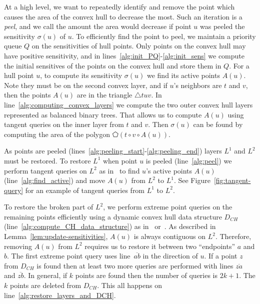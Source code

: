 \documentclass{cccg24}
\newcommand{\lrParents}[1]{\left( #1 \right)}
\newcommand{\Tri}[3]{\triangle #1#2#3}
\newcommand{\sens}[1]{\sigma\!\lrParents{#1}}
\newcommand{\poly}[1]{\pentagon\!\lrParents{#1}}
\begin{document}
At a high level, we want to repeatedly identify and remove the point which causes the area of the convex hull to decrease the most.
Such an iteration is a \emph{peel}, and we call the amount the area would decrease if point $u$ was peeled the sensitivity $\sens{u}$ of $u$. To efficiently find the point to peel, we maintain a priority queue $Q$ on the sensitivities of hull points. 
Only points on the convex hull may have positive sensitivity, and in lines~\ref{alg:init_PQ}-\ref{alg:init_sens} we compute the initial sensitives of the points on the convex hull and store them in $Q$. 
For a hull point $u$, to compute its sensitivity $\sens{u}$ we find its active points $A(u)$.
Note they must be on the second convex layer, and if $u$'s neighbors are $t$ and $v$, then the points $A(u)$ are in the triangle $\Tri{t}{u}{v}$.
In line~\ref{alg:computing_convex_layers} we compute the two outer convex hull layers represented as balanced binary trees. That allows us to compute $A(u)$ using tangent queries on the inner layer from $t$ and $v$.
Then $\sens u$ can be found by computing the area of the polygon $\poly{t \circ v \circ A(u)}$.





As points are peeled (lines~\ref{alg:peeling_start}-\ref{alg:peeling_end}) layers $L^1$ and $L^2$ must be restored. 
To restore $L^1$ when point $u$ is peeled (line~\ref{alg:peel}) we perform tangent queries on $L^2$ as in~\cite{loffler2014unions} to find $u$'s active points $A(u)$ (line~\ref{alg:find_active}) and move $A(u)$ from $L^2$ to $L^1$. See Figure~\ref{fig:tangent-query} for an example of tangent queries from $L^1$ to $L^2$.

To restore the broken part of $L^2$, we perform extreme point queries on the remaining points efficiently using a dynamic convex hull data structure $D_{CH}$ (line~\ref{alg:compute_CH_data_structure}) as in~\cite{1992_hershberger_semi_dynamic_CH} or~\cite{2002_brodal_rico_dynamic_CH}. As described in Lemma~\ref{lem:update-sensitivities}, $A(u)$ is always contiguous on $L^2$. Therefore, removing $A(u)$ from $L^2$ requires us to restore it between two ``endpoints'' $a$ and $b$. The first extreme point query uses line~$\overline{ab}$ in the direction of $u$. If a point $z$ from $D_{CH}$ is found then at least two more queries are performed with lines $\overline{za}$ and $\overline{zb}$. In general, if $k$ points are found then the number of queries is $2k + 1$. The $k$ points are deleted from $D_{CH}$. This all happens on line~\ref{alg:restore_layers_and_DCH}. 
\end{document}
